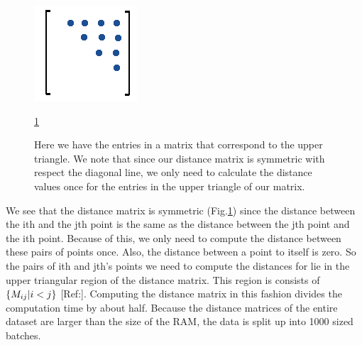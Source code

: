 \documentclass[12pt, a4paper, twocolumn, fullpage]{article}
\theoremstyle{plain}
\theoremstyle{definition}
\theoremstyle{remark}
\begin{document}
\begin{figure}[h]
	\centering
    \includegraphics[width=.7\linewidth]{uptry.png}
    \caption{Here we have the entries in a matrix that correspond to the upper triangle. We note that since our distance matrix is symmetric with respect the diagonal line, we only need to calculate the distance values once for the entries in the upper triangle of our matrix.}
     \ref{uptry}
    \label{uptry}
\end{figure}
    

We see that the distance matrix is symmetric (Fig.\ref{uptry}) since the distance between the ith and the jth point is the same as the distance between the jth point and the ith point. Because of this, we only need to compute the distance between these pairs of points once. Also, the distance between a point to itself is zero. So the pairs of ith and jth's points we need to compute the distances for lie in the upper triangular region of the distance matrix. This region is consists of $\{ M_{ij} \space | \space i<j \}$ [Ref:]. Computing the distance matrix in this fashion divides the computation time by about half. Because the distance matrices of the entire dataset are larger than the size of the RAM, the data is split up into 1000 sized batches. 

\begin{algorithm}
\caption{We fill in our distance matrix by calculating the upper triangle of a NxN matrix. Our rows and columns range from 1 to N.}
\begin{algorithmic}
    \ENDFOR
\ENDFOR
\end{algorithmic}
\end{algorithm}
\end{document}
